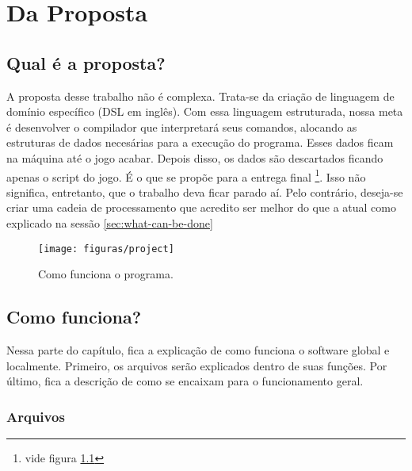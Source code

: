 \chapter{Da Proposta}
\label{cap:propose}

\section{Qual é a proposta?}
\label{sec:what_is}

A proposta desse trabalho não é complexa. Trata-se da criação de linguagem de
domínio específico (DSL em inglês). Com essa linguagem estruturada, nossa meta é
desenvolver o compilador que interpretará seus comandos, alocando as estruturas
de dados necesárias para a execução do programa. Esses dados ficam na máquina
até o jogo acabar. Depois disso, os dados são descartados ficando apenas o
script do jogo. É o que se propõe para a entrega final \footnote{vide figura
\ref{fig:project}}. Isso não significa, entretanto, que o trabalho deva ficar
parado aí. Pelo contrário, deseja-se criar uma cadeia de processamento que
acredito ser melhor do que a atual como explicado na sessão
\ref{sec:what-can-be-done}

\begin{figure}[htb]
  \centering
  \texttt{[image: figuras/project]}
  \caption{\label{fig:project} Como funciona o programa.}
\end{figure}


\section{Como funciona?}
\label{sec:how-it-works}

Nessa parte do capítulo, fica a explicação de como funciona o software global e
localmente. Primeiro, os arquivos serão explicados dentro de suas funções. Por
último, fica a descrição de como se encaixam para o funcionamento geral.

\subsection{Arquivos}
\label{subsec:files}

